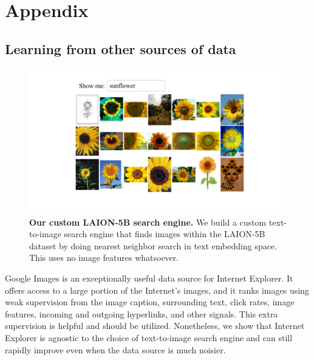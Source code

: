 \chapter{Appendix}

\section{Learning from other sources of data}
\label{sec:search_engine_details}
\begin{figure}
\centering
    \vspace{-1.5em}
    \includegraphics[width=\linewidth]{figures/laion_search_engine.pdf}
    \vspace{-1em}
    \caption{\textbf{Our custom LAION-5B search engine.} We build a custom text-to-image search engine that finds images within the LAION-5B dataset by doing nearest neighbor search in text embedding space. This uses no image features whatsoever.}
    \label{fig:laion_search_engine}
\end{figure}

Google Images is an exceptionally useful data source for Internet Explorer. It offers access to a large portion of the Internet's images, and it ranks images using weak supervision from the image caption, surrounding text, click rates, image features, incoming and outgoing hyperlinks, and other signals. This extra supervision is helpful and should be utilized. Nonetheless, we show that Internet Explorer is agnostic to the choice of text-to-image search engine and can still rapidly improve even when the data source is much noisier. 


